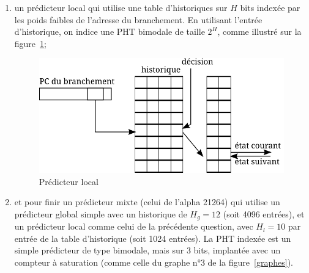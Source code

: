 \documentclass[a4paper]{article}
\begin{document}
\begin{enumerate}
\item un prédicteur local qui utilise une table d'historiques sur $H$ bits indexée par les poids faibles de l'adresse du branchement.  En utilisant l'entrée d'historique, on indice une PHT bimodale de taille $2^H$, comme illustré sur la figure~\ref{local};
      \begin{figure}[hbt]\center\leavevmode
      \includegraphics[scale=.9]{local}
      \caption{Prédicteur local}
      \label{local}
      \end{figure}

\item et pour finir un prédicteur mixte (celui de l'alpha 21264) qui utilise un prédicteur global simple avec un historique de $H_g=12$ (soit 4096 entrées), et un prédicteur local comme celui de la précédente question, avec $H_l=10$ par entrée de la table d'historique (soit 1024 entrées).
      La PHT indexée est un simple prédicteur de type bimodale, mais sur 3 bits, implantée avec un compteur à saturation (comme celle du graphe n°3 de la figure~\ref{graphes}).


\end{enumerate}
\end{document}
